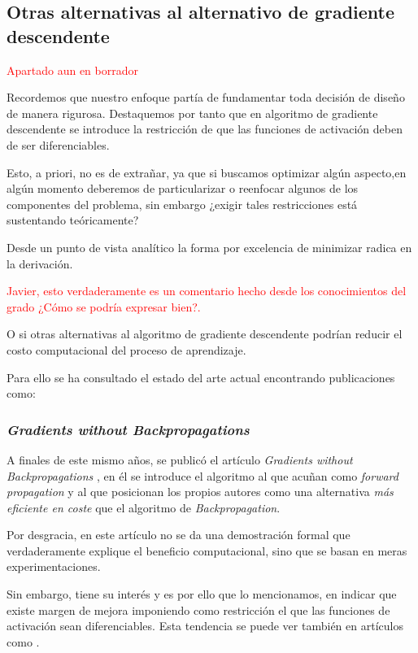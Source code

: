 
\subsection{Otras alternativas al alternativo de gradiente descendente}  

\textcolor{red}{ Apartado aun en borrador} 

Recordemos que nuestro enfoque partía de
fundamentar toda decisión de diseño de manera rigurosa. Destaquemos por tanto que en algoritmo de gradiente descendente se introduce la restricción de que 
las funciones de activación deben de ser diferenciables.

Esto, a priori, no es de extrañar, ya que si buscamos optimizar algún aspecto,en algún momento deberemos de particularizar o reenfocar algunos de los componentes del problema, sin embargo ¿exigir tales restricciones está sustentando teóricamente? 

Desde un punto de vista analítico la forma por excelencia de minimizar radica en la derivación. 

\textcolor{red}{Javier, esto verdaderamente es un comentario hecho desde los conocimientos del grado ¿Cómo se podría expresar bien?.}

O si otras alternativas al algoritmo de gradiente descendente podrían reducir el costo computacional del proceso de aprendizaje. 

Para ello se ha consultado el estado del arte actual encontrando publicaciones como: 

\subsubsection{\textit{Gradients without Backpropagations}}

A finales de este mismo años, se publicó el artículo \textit{Gradients without Backpropagations} \cite{forwardGradient}, en él se introduce el algoritmo al que acuñan como 
\textit{forward propagation} y al que posicionan los propios autores como una alternativa \textit{más eficiente en coste} que el algoritmo de \textit{Backpropagation}. 

Por desgracia, en este artículo no se da una demostración formal que verdaderamente explique el beneficio computacional, sino que se basan en meras experimentaciones. 

Sin embargo, tiene su interés y es por ello que lo mencionamos, en indicar que existe margen de mejora 
imponiendo como restricción el que las funciones de activación sean diferenciables. 
Esta tendencia se puede ver también en artículos como \cite{TransactionsOnNeuralNetworks}.



